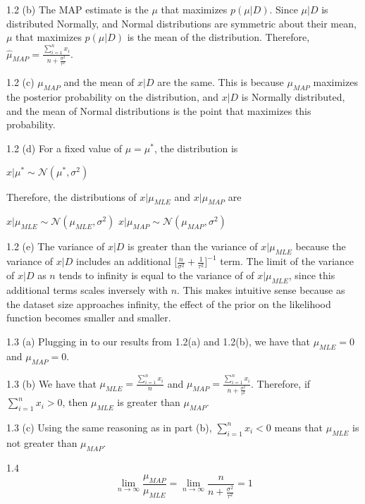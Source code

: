 \documentclass[submit]{harvardml}
\begin{document}
1.2 (b) The MAP estimate is the $\mu$ that maximizes $p(\mu|D)$. Since $\mu|D$ is distributed Normally, and Normal distributions are symmetric about their mean, $\mu$ that maximizes $p(\mu|D)$ is the mean of the distribution. Therefore, $\hat{\mu}_{MAP} = \frac{\sum_{i=1}^n x_i}{n + \frac{\sigma^2}{\tau^2}}$.

1.2 (c) $\mu_{MAP}$ and the mean of $x|D$ are the same. This is because $\mu_{MAP}$ maximizes the posterior probability on the distribution, and $x|D$ is Normally distributed, and the mean of Normal distributions is the point that maximizes this probability.

1.2 (d) For a fixed value of $\mu = \mu^*$, the distribution is 
\begin{center}
    $x|\mu^* \sim \mathcal{N}(\mu^*, \sigma^2)$
\end{center}
Therefore, the distributions of $x|\mu_{MLE}$ and $x|\mu_{MAP}$ are 
\begin{center}
    $x|\mu_{MLE} \sim \mathcal{N}(\mu_{MLE}, \sigma^2)$
    $x|\mu_{MAP} \sim \mathcal{N}(\mu_{MAP}, \sigma^2)$
\end{center}

1.2 (e) The variance of $x|D$ is greater than the variance of $x|\mu_{MLE}$ because the variance of $x|D$ includes an additional $\Big[ \frac{n}{\sigma^2} + \frac{1}{\tau^2} \Big]^{-1}$ term.
The limit of the variance of $x|D$ as $n$ tends to infinity is equal to the variance of of $x|\mu_{MLE}$, since this additional terms scales inversely with $n$. This makes intuitive sense because as the dataset size approaches infinity, the effect of the prior on the likelihood function becomes smaller and smaller.

1.3 (a) Plugging in to our results from 1.2(a) and 1.2(b), we have that $\mu_{MLE} = 0$ and $\mu_{MAP} = 0$.

1.3 (b) We have that $\mu_{MLE} = \frac{\sum_{i=1}^n x_i}{n}$ and $\mu_{MAP} = \frac{\sum_{i=1}^n x_i}{n+\frac{\sigma^2}{\tau^2}}$. Therefore, if $\sum_{i=1}^n x_i > 0$, then $\mu_{MLE}$ is greater than $\mu_{MAP}$.

1.3 (c) Using the same reasoning as in part (b), $\sum_{i=1}^n x_i < 0$ means that $\mu_{MLE}$ is not greater than $\mu_{MAP}$.

1.4 $$
    \lim_{n \rightarrow \infty} \frac{\mu_{MAP}}{\mu_{MLE}} = \lim_{n \rightarrow \infty} \frac{n}{n + \frac{\sigma^2}{\tau^2}} = 1
$$
\newpage
\end{document}
